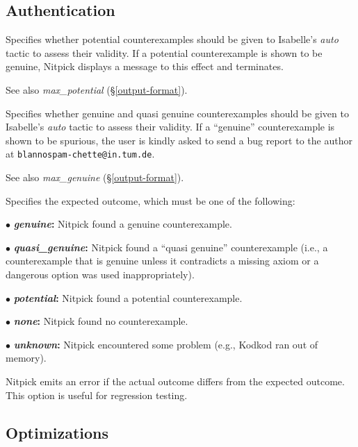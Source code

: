 \documentclass[a4paper,12pt]{article}
\begin{document}
\subsection{Authentication}
\label{authentication}

\begin{enum}
Specifies whether potential counterexamples should be given to Isabelle's
\textit{auto} tactic to assess their validity. If a potential counterexample is
shown to be genuine, Nitpick displays a message to this effect and terminates.

\nopagebreak
{\small See also \textit{max\_potential} (\S\ref{output-format}).}

Specifies whether genuine and quasi genuine counterexamples should be given to
Isabelle's \textit{auto} tactic to assess their validity. If a ``genuine''
counterexample is shown to be spurious, the user is kindly asked to send a bug
report to the author at
\texttt{blan{\color{white}nospam}\kern-\wd\boxA{}chette@in.tum.de}.

\nopagebreak
{\small See also \textit{max\_genuine} (\S\ref{output-format}).}

Specifies the expected outcome, which must be one of the following:

\begin{enum}
\item[$\bullet$] \textbf{\textit{genuine}:} Nitpick found a genuine counterexample.
\item[$\bullet$] \textbf{\textit{quasi\_genuine}:} Nitpick found a ``quasi
genuine'' counterexample (i.e., a counterexample that is genuine unless
it contradicts a missing axiom or a dangerous option was used inappropriately).
\item[$\bullet$] \textbf{\textit{potential}:} Nitpick found a potential counterexample.
\item[$\bullet$] \textbf{\textit{none}:} Nitpick found no counterexample.
\item[$\bullet$] \textbf{\textit{unknown}:} Nitpick encountered some problem (e.g.,
Kodkod ran out of memory).
\end{enum}

Nitpick emits an error if the actual outcome differs from the expected outcome.
This option is useful for regression testing.
\end{enum}

\subsection{Optimizations}
\label{optimizations}
\end{document}
